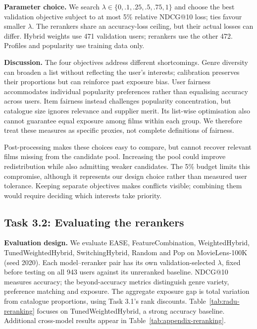 \documentclass[12pt,a4paper]{article}   %
\begin{document}
\textbf{Parameter choice.}
We search $\lambda\in\{0,.1,.25,.5,.75,1\}$ and choose the best validation objective subject to at most 5\% relative NDCG@10 loss; ties favour smaller $\lambda$. The rerankers share an accuracy-loss ceiling, but their actual losses can differ. Hybrid weights use 471 validation users; rerankers use the other 472. Profiles and popularity use training data only.

\textbf{Discussion.}
The four objectives address different shortcomings. Genre diversity can broaden a list without reflecting the user's interests; calibration preserves their proportions but can reinforce past exposure bias. User fairness accommodates individual popularity preferences rather than equalising accuracy across users. Item fairness instead challenges popularity concentration, but catalogue size ignores relevance and supplier merit. Its list-wise optimisation also cannot guarantee equal exposure among films within each group. We therefore treat these measures as specific proxies, not complete definitions of fairness.

Post-processing makes these choices easy to compare, but cannot recover relevant films missing from the candidate pool. Increasing the pool could improve redistribution while also admitting weaker candidates. The 5\% budget limits this compromise, although it represents our design choice rather than measured user tolerance. Keeping separate objectives makes conflicts visible; combining them would require deciding which interests take priority.

\clearpage
\subsection{Task 3.2: Evaluating the rerankers}

\textbf{Evaluation design.}
We evaluate EASE, FeatureCombination, WeightedHybrid, TunedWeightedHybrid, SwitchingHybrid, Random and Pop on MovieLens-100K (seed 2020). Each model--reranker pair has its own validation-selected $\lambda$, fixed before testing on all 943 users against its unreranked baseline. NDCG@10 measures accuracy; the beyond-accuracy metrics distinguish genre variety, preference matching and exposure. The aggregate exposure gap is total variation from catalogue proportions, using Task 3.1's rank discounts. Table~\ref{tab:radu-reranking} focuses on TunedWeightedHybrid, a strong accuracy baseline. Additional cross-model results appear in Table~\ref{tab:appendix-reranking}.
\end{document}
